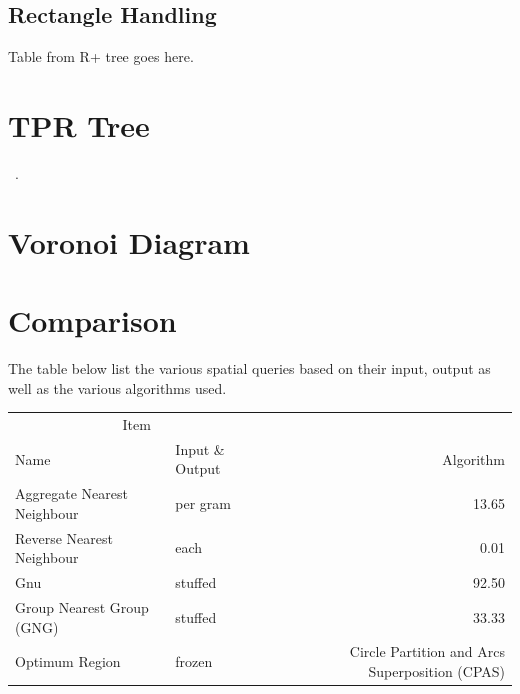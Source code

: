 \documentclass[a4paper,11pt]{article}
\begin{document}
\subsection{Rectangle Handling}
Table from R+ tree goes here.

\section{TPR\* Tree}
~\cite{tao2003tpr}.

\section{Voronoi Diagram}

\section{Comparison}

The table below list the various spatial queries based on their input, output as well as the various algorithms used.

\begin{tabular}{llr}
\hline
\multicolumn{2}{c}{Item} \\
\cline{1-2}
Name    & Input \& Output & Algorithm \\
\hline
Aggregate Nearest Neighbour      & per gram    & 13.65      \\
Reverse Nearest Neighbour          & each        & 0.01       \\
Gnu       & stuffed     & 92.50      \\
Group Nearest Group (GNG)       & stuffed     & 33.33      \\
Optimum Region & frozen      & Circle Partition and Arcs Superposition (CPAS)       \\
\hline
\end{tabular}



\clearpage


\end{document}
